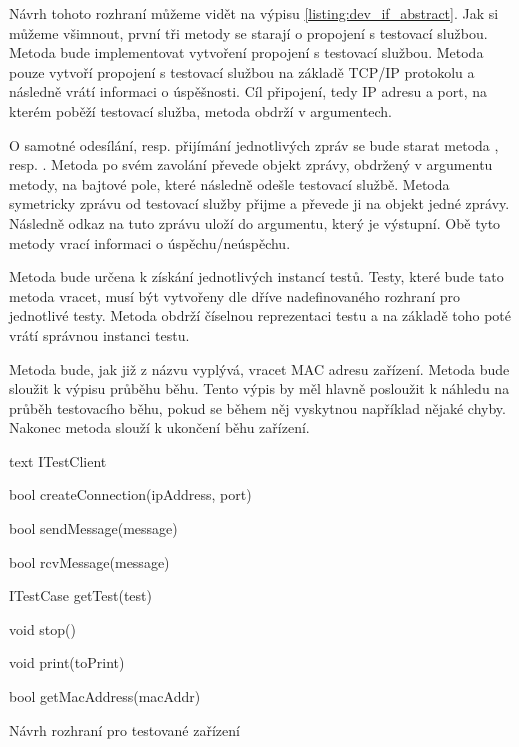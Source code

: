 Návrh tohoto rozhraní můžeme vidět na výpisu \ref{listing:dev_if_abstract}. Jak si můžeme všimnout, první tři metody se starají o propojení s testovací službou. Metoda  bude implementovat vytvoření propojení s testovací službou. Metoda pouze vytvoří propojení s testovací službou na základě TCP/IP protokolu a následně vrátí informaci o úspěšnosti. Cíl připojení, tedy IP adresu a port, na kterém poběží testovací služba, metoda obdrží v argumentech.

O samotné odesílání, resp. přijímání jednotlivých zpráv se bude starat metoda , resp. . Metoda  po svém zavolání převede objekt zprávy, obdržený v argumentu metody, na bajtové pole, které následně odešle testovací službě. Metoda  symetricky zprávu od testovací služby přijme a převede ji na objekt jedné zprávy. Následně odkaz na tuto zprávu uloží do argumentu, který je výstupní. Obě tyto metody vrací informaci o úspěchu/neúspěchu.

Metoda  bude určena k získání jednotlivých instancí testů. Testy, které bude tato metoda vracet, musí být vytvořeny dle dříve nadefinovaného rozhraní pro jednotlivé testy. Metoda obdrží číselnou reprezentaci testu a na základě toho poté vrátí správnou instanci testu. 

Metoda  bude, jak již z názvu vyplývá, vracet MAC adresu zařízení. Metoda  bude sloužit k výpisu průběhu běhu. Tento výpis by měl hlavně posloužit k náhledu na průběh testovacího běhu, pokud se během něj vyskytnou například nějaké chyby. Nakonec metoda  slouží k ukončení běhu zařízení.


\begin{listing}[htbp]
    \centering
    \begin{cminted}[breaklines]{text}
ITestClient 
{
    bool createConnection(ipAddress, port)

    bool sendMessage(message)

    bool rcvMessage(message)

    ITestCase getTest(test)

    void stop()

    void print(toPrint)

    bool getMacAddress(macAddr)
}
    \end{cminted}
\caption{Návrh rozhraní pro testované zařízení}
\label{listing:dev_if_abstract}
\end{listing}

